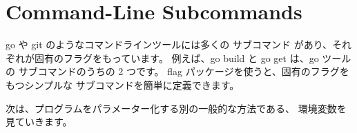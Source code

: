 \section{Command-Line Subcommands}

go や git のようなコマンドラインツールには多くの サブコマンド があり、それぞれが固有のフラグをもっています。 例えば、go build と go get は、go ツールの サブコマンドのうちの 2 つです。 flag パッケージを使うと、固有のフラグをもつシンプルな サブコマンドを簡単に定義できます。




次は、プログラムをパラメーター化する別の一般的な方法である、 環境変数を見ていきます。